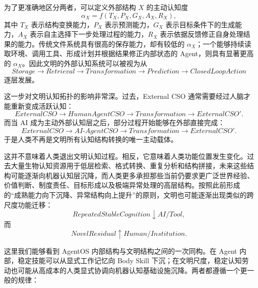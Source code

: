 为了更准确地区分两者，可以定义外部结构 $X$ 的主动认知度
\begin{equation}
\alpha_X
=
f
\left(
T_X,
P_X,
G_X,
A_X,
R_X
\right),
\end{equation}
其中 $T_X$ 表示结构变换能力，$P_X$ 表示预测能力，$G_X$ 表示目标条件下的生成能力，$A_X$ 表示自主选择下一步处理过程的能力，$R_X$ 表示依据反馈修正自身处理结果的能力。传统文件系统具有很高的保存能力，却有较低的 $\alpha_X$；一个能够持续读取环境、调用工具、形成计划并根据结果修正内部状态的 Agent，则具有显著更高的 $\alpha_X$。因此文明的外部认知系统可以被视为从
\begin{equation}
Storage
\rightarrow
Retrieval
\rightarrow
Transformation
\rightarrow
Prediction
\rightarrow
ClosedLoopAction
\end{equation}
逐层发展。

这一步对文明认知拓扑的影响非常深。过去，External CSO 通常需要经过人脑才能重新变成活跃认知：
\begin{equation}
ExternalCSO
\rightarrow
HumanAgentCSO
\rightarrow
Transformation
\rightarrow
ExternalCSO'.
\end{equation}
而当 AI 成为主动外部认知层之后，部分过程开始能够在外部直接完成：
\begin{equation}
ExternalCSO
\rightarrow
AI\text{-}AgentCSO
\rightarrow
Transformation
\rightarrow
ExternalCSO'.
\end{equation}
于是人类不再是文明所有认知结构转换的唯一主动载体。

这并不意味着人类退出文明认知过程。相反，它意味着人类功能位置发生变化。过去大量生物认知资源用于低层检索、格式转换、重复分析和结构拼接，未来这些结构可能逐渐向机器认知层沉降，而人类更多承担那些当前仍要求更广泛世界经验、价值判断、制度责任、目标形成以及极端异常处理的高层结构。按照此前形成的“成熟能力向下沉降、异常结构向上提升”的原则，文明也可能逐渐出现类似的跨尺度功能迁移：
\begin{equation}
RepeatedStableCognition
\downarrow
AI/Tool,
\end{equation}
而
\begin{equation}
NovelResidual
\uparrow
Human/Institution.
\end{equation}

这里我们能够看到 AgentOS 内部结构与文明结构之间的一次同构。在 Agent 内部，稳定技能可以从显式工作记忆向 Body Skill 下沉；在文明尺度，稳定认知劳动也可能从高成本的人类显式协调向机器认知基础设施沉降。两者都遵循一个更一般的规律：
\begin{statementbox}
\centering
{}
\end{statementbox}


